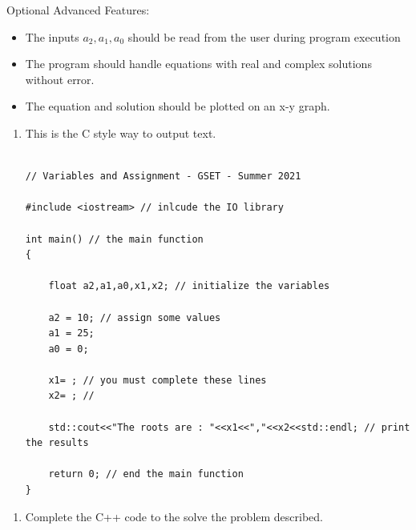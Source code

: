 \documentclass[12pt]{article}
\begin{document}
\begin{description}[labelindent=1cm]
\begin{itemize}
\end{itemize}	 
	Optional Advanced Features:
\begin{itemize}
	\item The inputs $a_2,a_1,a_0$ should be read from the user during program execution
		
	\item The program should handle equations with real and complex solutions without error. 
    
    \item The equation and solution should be plotted on an x-y graph.
    
\end{itemize}	
\newpage

\item[\textbf{\underline{Example Code:}}] \hfill \vspace{0mm}
\begin{enumerate}
    \item This is the C style way to output text.
	\begin{lstlisting}

// Variables and Assignment - GSET - Summer 2021 
	
#include <iostream> // inlcude the IO library

int main() // the main function
{

	float a2,a1,a0,x1,x2; // initialize the variables
	
	a2 = 10; // assign some values
	a1 = 25;
	a0 = 0;
	
	x1= ; // you must complete these lines
	x2= ; //
	
	std::cout<<"The roots are : "<<x1<<","<<x2<<std::endl; // print the results
	
	return 0; // end the main function
}

	\end{lstlisting}
		
\end{enumerate}

	\item[\textbf{\underline{Part 3 - Testing:}}] \hfill \vspace{0mm}
	\begin{enumerate}
	
		\item Complete the C++ code to the solve the problem described. \\\\
		

\end{enumerate}
\end{description}
\end{document}
